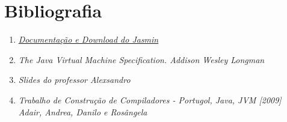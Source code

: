 \documentclass[12pt,a4paper,twoside]{report}
\begin{document}
\section{Bibliografia}
	
    \begin{enumerate}
	

	\item \href {http://jasmin.sourceforge.net} {\textit   {Documentação e Download do Jasmin}}

	\item \textit {The Java Virtual Machine Specification. Addison Wesley Longman }
	
    	\item \textit {Slides do professor Alexsandro}

	\item \textit { Trabalho de Construção de Compiladores  -  Portugol, Java, JVM [2009] Adair, Andrea, Danilo e Rosângela}

	\end{enumerate}
\end{document}
